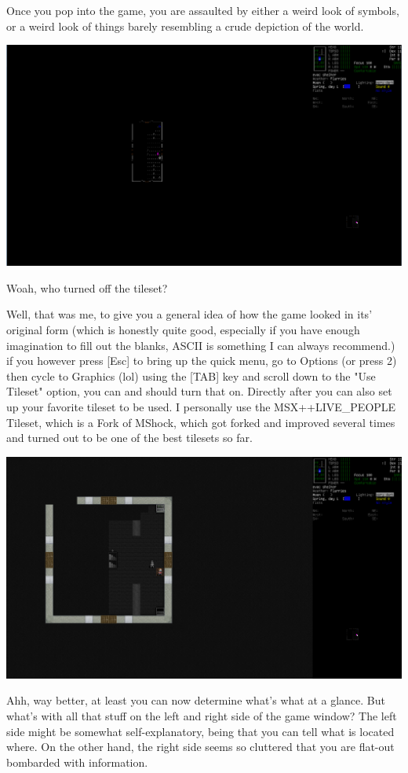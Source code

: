 \documentclass[11pt]{report}
\begin{document}
Once you pop into the game, you are assaulted by either a weird look of symbols, or a weird look of things barely resembling a crude depiction of the world.

\includegraphics[width=\textwidth]{03}

Woah, who turned off the tileset?

Well, that was me, to give you a general idea of how the game looked in its' original form (which is honestly quite good, especially if you have enough imagination to fill out the blanks, ASCII is something I can always recommend.) if you however press [Esc] to bring up the quick menu, go to Options (or press 2) then cycle to Graphics (lol) using the [TAB] key and scroll down to the "Use Tileset" option, you can and should turn that on. Directly after you can also set up your favorite tileset to be used. I personally use the MSX++LIVE\_PEOPLE Tileset, which is a Fork of MShock, which got forked and improved several times and turned out to be one of the best tilesets so far.

\includegraphics[width=\textwidth]{04}

Ahh, way better, at least you can now determine what's what at a glance. But what's with all that stuff on the left and right side of the game window? The left side might be somewhat self-explanatory, being that you can tell what is located where. On the other hand, the right side seems so cluttered that you are flat-out bombarded with information.
\end{document}
